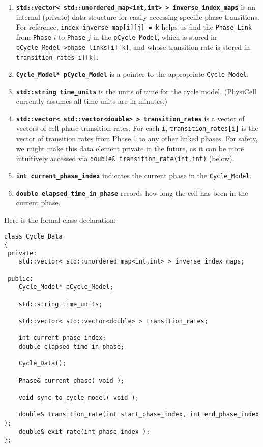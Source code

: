 \documentclass[12pt]{article}
\renewcommand{\v}{\verb}
\newcommand{\smallcode}[1]{\textbf{\texttt{#1}}}
\begin{document}
\begin{enumerate}
\item 
\smallcode{std::vector< std::unordered\_map<int,int> > inverse\_index\_maps} is an internal (private) data structure for easily 
accessing specific phase transitions. For reference,  \hfill\break 
\v|index_inverse_map[i][j] = k| helps us find the \v|Phase_Link| from 
\v|Phase| $i$ to \v|Phase| $j$ in the \v|pCycle_Model|, which is stored in 
\v|pCycle_Model->phase_links[i][k]|, 
and whose transition rate is stored in \v|transition_rates[i][k]|. 

\item 
\smallcode{Cycle\_Model* pCycle\_Model} is a pointer to the appropriate \v|Cycle_Model|. 

\item 
\smallcode{std::string time\_units} is the units of time for the cycle model. (PhysiCell currently 
assumes all time units are in minutes.) 

\item 
\smallcode{std::vector< std::vector<double> > transition\_rates} is a vector of vectors of cell phase transition rates. 
For each \v|i|,  
\v|transition_rates[i]| is the vector of transition rates from 
Phase \v|i| to any other linked phases. For safety, we might make this data 
element private in the future, as it can be more intuitively accessed via 
\v|double& transition_rate(int,int)| (below). 

\item 
\smallcode{int current\_phase\_index} indicates the current phase in the \v|Cycle_Model|.

\item 
\smallcode{double elapsed\_time\_in\_phase} records how long the cell has been in the current phase. 

\end{enumerate}

Here is the formal class declaration:
\begin{verbatim}
class Cycle_Data
{
 private:
    std::vector< std::unordered_map<int,int> > inverse_index_maps; 

 public:
    Cycle_Model* pCycle_Model; 

    std::string time_units; 
 
    std::vector< std::vector<double> > transition_rates; 
    
    int current_phase_index; 
    double elapsed_time_in_phase; 
    
    Cycle_Data();  
    
    Phase& current_phase( void );      
    
    void sync_to_cycle_model( void );      

    double& transition_rate(int start_phase_index, int end_phase_index );     
    double& exit_rate(int phase_index ); 
};
\end{verbatim}
\end{document}
